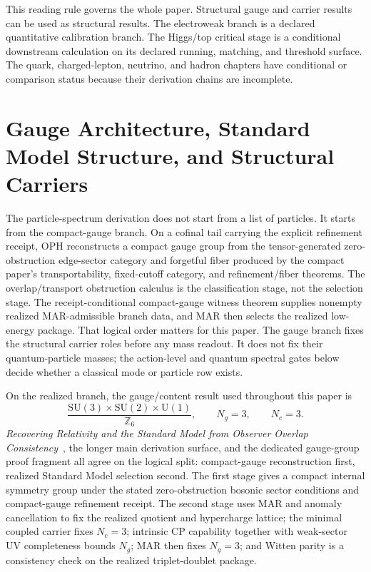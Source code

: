 \documentclass[11pt]{article}
\newcommand{\SU}{\mathrm{SU}}
\newcommand{\U}{\mathrm{U}}
\begin{document}
This reading rule governs the whole paper. Structural gauge and carrier results can be used
as structural results. The electroweak branch is a declared quantitative calibration branch. The
Higgs/top critical stage is a conditional downstream calculation on its declared running, matching, and threshold surface. The quark,
charged-lepton, neutrino, and hadron chapters have conditional or comparison status because
their derivation chains are incomplete.

\section{Gauge Architecture, Standard Model Structure, and Structural Carriers}

The particle-spectrum derivation does not start from a list of particles. It starts from the
compact-gauge branch. On a cofinal tail carrying the explicit refinement receipt, OPH reconstructs
a compact gauge group from the tensor-generated zero-obstruction edge-sector category and
forgetful fiber produced by the compact paper's transportability, fixed-cutoff category, and
refinement/fiber theorems. The overlap/transport obstruction calculus is the classification stage,
not the selection stage. The receipt-conditional compact-gauge witness theorem supplies nonempty
realized MAR-admissible branch data, and MAR then selects the
realized low-energy package. That logical order matters for this paper. The
gauge branch fixes the structural carrier roles before any mass readout. It does not fix their
quantum-particle masses; the action-level and quantum spectral gates below decide whether a
classical mode or particle row exists.

On the realized branch, the gauge/content result used throughout this paper is
\[
\frac{\SU(3)\times\SU(2)\times\U(1)}{\mathbb Z_6},
\qquad
N_g=3,
\qquad
N_c=3.
\]
\emph{Recovering Relativity and the Standard Model from Observer Overlap Consistency}~\cite{ophcompact}, the longer main derivation surface, and the dedicated gauge-group proof
fragment all agree on the logical split: compact-gauge reconstruction first, realized Standard
Model selection second. The first stage gives a compact internal symmetry group under the stated
zero-obstruction bosonic sector conditions and compact-gauge refinement receipt. The second stage uses MAR and anomaly cancellation to fix the realized
quotient and hypercharge lattice; the minimal coupled carrier fixes \(N_c=3\); intrinsic CP
capability together with weak-sector UV completeness bounds \(N_g\); MAR then fixes \(N_g=3\);
and Witten parity is a consistency check on the realized triplet-doublet package.
\end{document}

